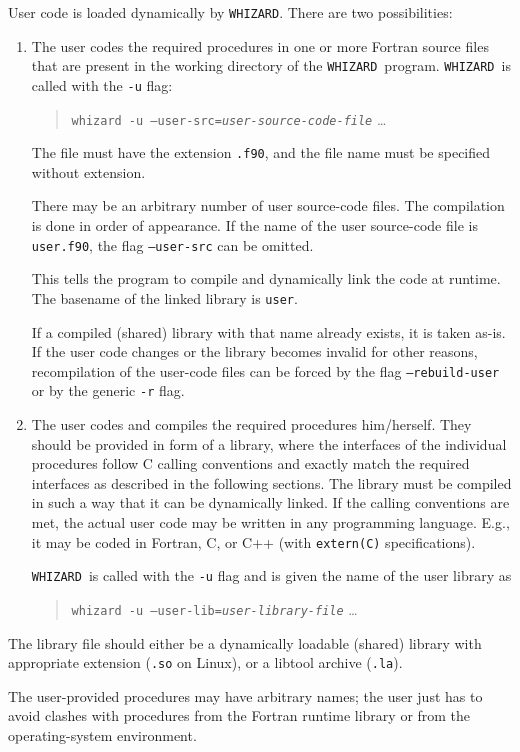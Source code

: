 \documentclass[12pt]{book}
\newcommand{\ttt}[1]{\texttt{#1}}
\newcommand{\whizard}{\texttt{WHIZARD}}
\begin{document}
User code is loaded dynamically by \whizard.  There are two
possibilities:
\begin{enumerate}
\item
  The user codes the required procedures in one or more Fortran source
  files that are present in the working directory of the \whizard\
  program.  \whizard\ is called with the \texttt{-u} flag:
  \begin{quote}
    \ttt{whizard -u --user-src=\emph{user-source-code-file}} \ldots
  \end{quote}
  The file must have the extension \ttt{.f90}, and the file name must
  be specified without extension.

  There may be an arbitrary number of user source-code files.  The
  compilation is done in order of appearance.  If the name of the user
  source-code file is \ttt{user.f90}, the flag \ttt{--user-src} can
  be omitted.

  This tells the program to compile and dynamically link the code at
  runtime.  The basename of the linked library is \ttt{user}.

  If a compiled (shared) library with that name already exists, it is taken
  as-is.  If the 
  user code changes or the library becomes invalid for other reasons,
  recompilation of the user-code files can be forced by the flag
  \ttt{--rebuild-user} or by the generic \ttt{-r} flag.
\item
  The user codes and compiles the required procedures him/herself.
  They should be provided in form of a library, where the interfaces of
  the individual procedures follow C calling conventions and exactly
  match the required interfaces as described in the following
  sections.  The library must be compiled in such a way that it can be
  dynamically linked.  If the calling conventions are met, the actual
  user code may be written in any programming language.  E.g., it may
  be coded in Fortran, C, or C++ (with \ttt{extern(C)} specifications).

  \whizard\ is called with the \texttt{-u} flag and is
  given the name of the user library as
  \begin{quote}
    \ttt{whizard -u --user-lib=\emph{user-library-file}} \ldots
  \end{quote}
\end{enumerate}
The library file should either be a dynamically loadable (shared)
library with appropriate extension (\ttt{.so} on Linux), or a libtool
archive (\ttt{.la}).

The user-provided procedures may have arbitrary names; the user just
has to avoid clashes with procedures from the Fortran runtime library
or from the operating-system environment.
\end{document}
